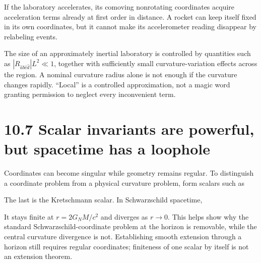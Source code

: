 \documentclass[
  11pt,
  letterpaper,
  oneside,
  openany]{scrbook}
\begin{document}
If the laboratory accelerates, its comoving nonrotating coordinates
acquire acceleration terms already at first order in distance. A rocket
can keep itself fixed in its own coordinates, but it cannot make its
accelerometer reading disappear by relabeling events.

The size of an approximately inertial laboratory is controlled by
quantities such as \(|R_{\hat a\hat b\hat c\hat d}|L^2\ll1\), together
with sufficiently small curvature-variation effects across the region. A
nominal curvature radius alone is not enough if the curvature changes
rapidly. ``Local'' is a controlled approximation, not a magic word
granting permission to neglect every inconvenient term.

\hypertarget{scalar-invariants-are-powerful-but-spacetime-has-a-loophole}{%
\section{10.7 Scalar invariants are powerful, but spacetime has a
loophole}\label{scalar-invariants-are-powerful-but-spacetime-has-a-loophole}}

Coordinates can become singular while geometry remains regular. To
distinguish a coordinate problem from a physical curvature problem, form
scalars such as

\begin{center}
\begingroup
{}
\ifdim\wd\grmathbox>\linewidth
\resizebox{\linewidth}{!}{\usebox{\grmathbox}}
\else\usebox{\grmathbox}\fi
\endgroup
\end{center}

The last is the Kretschmann scalar. In Schwarzschild spacetime,

\begin{center}
\begingroup
{}
\ifdim\wd\grmathbox>\linewidth
\resizebox{\linewidth}{!}{\usebox{\grmathbox}}
\else\usebox{\grmathbox}\fi
\endgroup
\end{center}

It stays finite at \(r=2G_NM/c^2\) and diverges as \(r\to0\). This helps
show why the standard Schwarzschild-coordinate problem at the horizon is
removable, while the central curvature divergence is not. Establishing
smooth extension through a horizon still requires regular coordinates;
finiteness of one scalar by itself is not an extension theorem.
\end{document}
